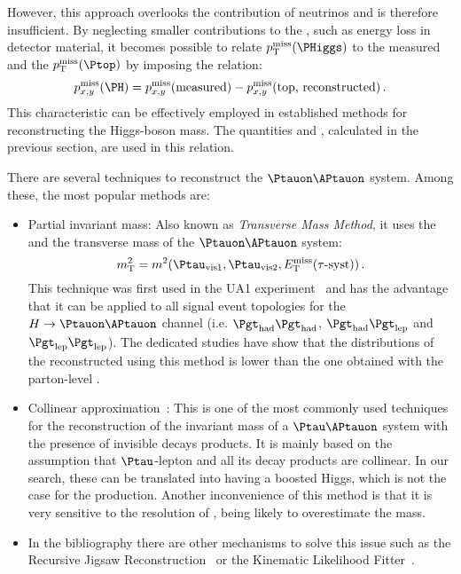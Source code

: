 However, this approach overlooks the contribution of neutrinos and is therefore insufficient. 
By neglecting smaller contributions to the \MET, such as energy loss in detector material, 
it becomes possible to relate $\pT^{\text{miss}}(\PHiggs)$ to the measured \MET and the 
$\pT^{\text{miss}}(\Ptop)$ by imposing the relation:
\begin{equation*}
    p^{\text{miss}}_{x,y}(\PH) = p^{\text{miss}}_{x,y}(\text{measured})
      - p^{\text{miss}}_{x,y}(\text{top, reconstructed})\,.
\end{equation*}
This characteristic can be effectively employed in established methods for reconstructing 
the Higgs-boson mass.
The quantities \pnutopT and \phinutop, calculated in the previous section, are used in this relation.

There are several techniques to reconstruct the $\Ptauon\APtauon$ system. Among these,
the most popular methods are:
\begin{itemize}
	\item Partial invariant mass: Also known as \textit{Transverse Mass Method}, it uses
		the \Hvismass and the transverse mass of the $\Ptauon\APtauon$ system:
		\begin{equation*}
			m_{\text{T}}^{2} = m^{2} (\Ptau_{\text{vis}1}, \Ptau_{\text{vis}2}, \MET(\tau\text{-syst}) )\,.
		\end{equation*}
		This technique was first used in the UA1 experiment~\cite{Rubbia:155129} and has
		the advantage that it can be applied to all signal event topologies for the 
		$H \rightarrow \Ptauon \APtauon$ channel (i.e. $\tauhad \tauhad$, $\tauhad \taulep$ and $\taulep \taulep$). 
		The dedicated studies have show that the distributions of the reconstructed \mH using this method is
		lower than the one obtained with the parton-level \mH.
		
	\item Collinear approximation~\cite{Ellis:1987xu}: This is one of the most commonly 
		used techniques for the reconstruction of the invariant mass of a $\Ptau\APtauon$ 
		system with the presence of invisible decays products.
		It is mainly based on the assumption that $\Ptau$-lepton and all its decay
		products are collinear. In our search, these can be translated into having a boosted
		Higgs, which is not the case for the \tHq production.
		Another inconvenience of this method is that it is very sensitive to the
		resolution of \MET, being likely to overestimate the mass. 
		
	\item In the bibliography there are other mechanisms to solve this issue such as the 
		Recursive Jigsaw Reconstruction~\cite{Jackson:2017gcy} or the 
		Kinematic Likelihood Fitter~\cite{Erdmann:2013rxa}.
		
		
\end{itemize}

